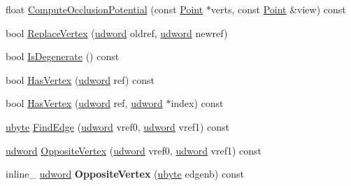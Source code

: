 \begin{DoxyCompactItemize}
\item 
float \hyperlink{classOpcode_1_1IndexedTriangle_a4df6adef9fba2d9426e13f03a12b0ea1}{Compute\+Occlusion\+Potential} (const \hyperlink{classOpcode_1_1Point}{Point} $\ast$verts, const \hyperlink{classOpcode_1_1Point}{Point} \&view) const 
\item 
bool \hyperlink{classOpcode_1_1IndexedTriangle_af5a5f522cb0b97eb27fc5bb62e6fc4e7}{Replace\+Vertex} (\hyperlink{IceTypes_8h_a44c6f1920ba5551225fb534f9d1a1733}{udword} oldref, \hyperlink{IceTypes_8h_a44c6f1920ba5551225fb534f9d1a1733}{udword} newref)
\item 
bool \hyperlink{classOpcode_1_1IndexedTriangle_a5ddd2c34c037481e0ba2b36b39e3f9ac}{Is\+Degenerate} () const 
\item 
bool \hyperlink{classOpcode_1_1IndexedTriangle_a5044242b46d49fd7b728f96b8d945e10}{Has\+Vertex} (\hyperlink{IceTypes_8h_a44c6f1920ba5551225fb534f9d1a1733}{udword} ref) const 
\item 
bool \hyperlink{classOpcode_1_1IndexedTriangle_a3698519a215745600e9a40ce49eca410}{Has\+Vertex} (\hyperlink{IceTypes_8h_a44c6f1920ba5551225fb534f9d1a1733}{udword} ref, \hyperlink{IceTypes_8h_a44c6f1920ba5551225fb534f9d1a1733}{udword} $\ast$index) const 
\item 
\hyperlink{IceTypes_8h_a5dd4f281954ce1405c92d62a427f839a}{ubyte} \hyperlink{classOpcode_1_1IndexedTriangle_aa8fc0c2b6623832647fa880e98de23b7}{Find\+Edge} (\hyperlink{IceTypes_8h_a44c6f1920ba5551225fb534f9d1a1733}{udword} vref0, \hyperlink{IceTypes_8h_a44c6f1920ba5551225fb534f9d1a1733}{udword} vref1) const 
\item 
\hyperlink{IceTypes_8h_a44c6f1920ba5551225fb534f9d1a1733}{udword} \hyperlink{classOpcode_1_1IndexedTriangle_a0c7351a54375f0a939bc3707c28508c8}{Opposite\+Vertex} (\hyperlink{IceTypes_8h_a44c6f1920ba5551225fb534f9d1a1733}{udword} vref0, \hyperlink{IceTypes_8h_a44c6f1920ba5551225fb534f9d1a1733}{udword} vref1) const 
\item 
inline\+\_\+ \hyperlink{IceTypes_8h_a44c6f1920ba5551225fb534f9d1a1733}{udword} {\bfseries Opposite\+Vertex} (\hyperlink{IceTypes_8h_a5dd4f281954ce1405c92d62a427f839a}{ubyte} edgenb) const \hypertarget{classOpcode_1_1IndexedTriangle_ac0e5e0429aea095fe83cd162b125e029}{}\label{classOpcode_1_1IndexedTriangle_ac0e5e0429aea095fe83cd162b125e029}


\end{DoxyCompactItemize}
